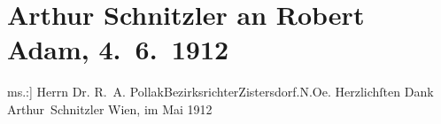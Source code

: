 

         
         \renewcommand{\erwaehntePersonen}{Personen: Robert Adam}
         \renewcommand{\erwaehnteOrte}{Orte: Niederösterreich, Wien, XVIII., Währing, Zistersdorf}
         \renewcommand{\erwaehnteWerke}{}
               \section[Arthur Schnitzler an Robert Adam, 4. 6. 1912]{ Arthur Schnitzler an Robert Adam, 4. 6. 1912}\nopagebreak{}\rehead{ }\begin{ledgroupsized}[t]{13cm}\normalsize\beginnumbering \toendnotes[C]{\smallbreak\pagebreak[2]} 
\pstart{}{\pb}{[}ms.:{]} Herrn Dr. R. A. Pollak\pend{}\pstart{}Bezirksrichter\pend{}\pstart{}Zistersdorf.\pend{}\pstart{}N.Oe.\pend{}{\bigskip}\pstart
           \noindent{}{\pb}Herzlichſten Dank\pend
           \pstart \spacefill\mbox{Arthur Schnitzler}\pend{}\pstart
           Wien, im Mai 1912\pend
           
         
         \endnumbering{}\end{ledgroupsized}  \newcommand{\dateiname}{L02073}\newcommand{\titel}{Arthur Schnitzler an Robert Adam, 4. 6. 1912}\newcommand{\editorInnen}{Martin Anton Müller und Gerd-Hermann Susen}
      